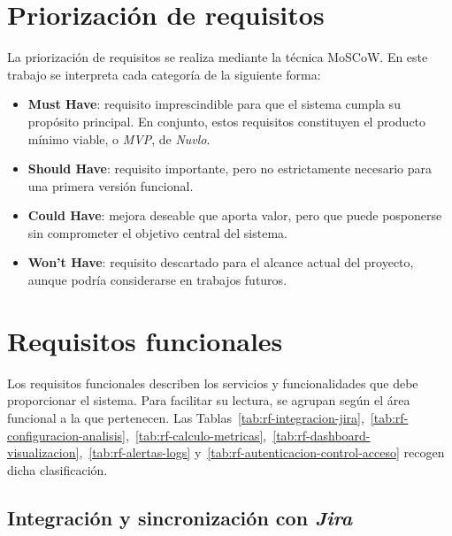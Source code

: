 \section{Priorización de requisitos}

La priorización de requisitos se realiza mediante la técnica MoSCoW. En este trabajo se interpreta cada categoría de la siguiente forma:

\begin{itemize}
    \item \textbf{Must Have}: requisito imprescindible para que el sistema cumpla su propósito principal. En conjunto, estos requisitos constituyen el producto mínimo viable, o \textit{MVP}, de \textit{Nuvlo}.
    \item \textbf{Should Have}: requisito importante, pero no estrictamente necesario para una primera versión funcional.
    \item \textbf{Could Have}: mejora deseable que aporta valor, pero que puede posponerse sin comprometer el objetivo central del sistema.
    \item \textbf{Won't Have}: requisito descartado para el alcance actual del proyecto, aunque podría considerarse en trabajos futuros.
\end{itemize}

\section{Requisitos funcionales}

Los requisitos funcionales describen los servicios y funcionalidades que debe proporcionar el sistema. Para facilitar su lectura, se agrupan según el área funcional a la que pertenecen. Las Tablas~\ref{tab:rf-integracion-jira},~\ref{tab:rf-configuracion-analisis},~\ref{tab:rf-calculo-metricas},~\ref{tab:rf-dashboard-visualizacion},~\ref{tab:rf-alertas-logs} y~\ref{tab:rf-autenticacion-control-acceso} recogen dicha clasificación.

\subsection{Integración y sincronización con \textit{Jira}}

